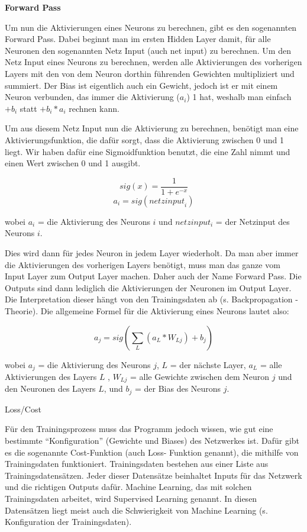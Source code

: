 \documentclass{scrartcl}
\begin{document}
	\vspace{1ex}
	\noindent \textbf{Forward Pass}
	\vspace{0.5ex}

	Um nun die Aktivierungen eines Neurons zu berechnen, gibt es den sogenannten Forward Pass. Dabei beginnt man im ersten Hidden Layer damit, für alle Neuronen den sogenannten Netz Input (auch net input) zu berechnen. Um den Netz Input eines Neurons zu berechnen, werden alle Aktivierungen des vorherigen Layers mit den von dem Neuron dorthin führenden Gewichten multipliziert und summiert. Der Bias ist eigentlich auch ein Gewicht, jedoch ist er mit einem Neuron verbunden, das immer die Aktivierung ($a_i$) 1 hat, weshalb man einfach $+ b_i$ statt $+ b_i * a_i$ rechnen kann.
	
	Um aus diesem Netz Input nun die Aktivierung zu berechnen, benötigt man eine Aktivierungsfunktion, die dafür sorgt, dass die Aktivierung zwischen 0 und 1 liegt. Wir haben dafür eine Sigmoidfunktion benutzt, die eine Zahl nimmt und einen Wert zwischen 0 und 1 ausgibt. 
	
	{\Large
	\[sig(x)=\frac{1}{1+e^{-x}}\]
	\[a_i=sig\left({netzinput}_i \right)\]}

	wobei $a_i$ = die Aktivierung des Neurons $i$ und $netzinput_{i}$ = der Netzinput des Neurons $i$.

	Dies wird dann für jedes Neuron in jedem Layer wiederholt. Da man aber immer die Aktivierungen des vorherigen Layers benötigt, muss man das ganze vom Input Layer zum Output Layer machen. Daher auch der Name Forward Pass. Die Outputs sind dann lediglich die Aktivierungen der Neuronen im Output Layer. Die Interpretation dieser hängt von den Trainingsdaten ab (s. Backpropagation - Theorie). Die allgemeine Formel für die Aktivierung eines Neurons lautet also: 

	{\Large \[a_{j} = sig\left(\sum_{L} (a_{L} * W_{Lj}) + b_{j}\right)\]}
		
	\noindent wobei $a_j$ = die Aktivierung des Neurons $j$, $L$ = der nächste Layer, $a_L$ = alle Aktivierungen des Layers $L$ , $W_{Lj}$ = alle Gewichte zwischen dem Neuron $j$ und den Neuronen des Layers $L$, und $b_j$ = der Bias des Neurons $j$.
	
	Loss/Cost 

	Für den Trainingsprozess muss das Programm jedoch wissen, wie gut eine bestimmte “Konfiguration” (Gewichte und Biases) des Netzwerkes ist. Dafür gibt es die sogenannte Cost-Funktion (auch Loss- Funktion genannt), die mithilfe von Trainingsdaten funktioniert. Trainingsdaten bestehen aus einer Liste aus Trainingsdatensätzen. Jeder dieser Datensätze beinhaltet Inputs für das Netzwerk und die richtigen Outputs dafür. Machine Learning, das mit solchen Trainingsdaten arbeitet, wird Supervised Learning genannt. In diesen Datensätzen liegt meist auch die Schwierigkeit von Machine Learning (s. Konfiguration der Trainingsdaten). 
\end{document}
